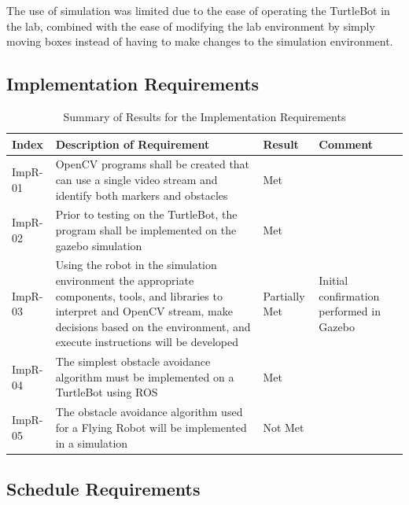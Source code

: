 \documentclass{article}[12]
\begin{document}
The use of simulation was limited due to the ease of operating the TurtleBot in the lab, combined with the ease of modifying the lab environment by simply moving boxes instead of having to make changes to the simulation environment.

 \subsection{Implementation Requirements}
 
	\begin{table}[H]
  \small
		\begin{tabular}{p{2cm} p{8cm} p{2cm} p{3cm}}
			\hline
			{\textbf{Index}} & {\textbf{Description of Requirement}} & {\textbf{Result}} & {\textbf{Comment}} \\ \hline 
ImpR-01 & OpenCV programs shall be created that can use a single video stream and identify both markers and obstacles & Met & \\ 
ImpR-02 & Prior to testing on the TurtleBot, the program shall be implemented on the gazebo simulation & Met & \\
ImpR-03 & Using the robot in the simulation environment the appropriate components, tools, and libraries to interpret and OpenCV stream, make decisions based on the environment, and execute instructions will be developed & Partially Met & Initial confirmation performed in Gazebo \\
ImpR-04 & The simplest obstacle avoidance algorithm must be implemented on a TurtleBot using ROS & Met & \\
ImpR-05 & The obstacle avoidance algorithm used for a Flying Robot will be implemented in a simulation & Not Met & \\ \hline
		\end{tabular}
		\caption{Summary of Results for the Implementation Requirements}
		\label{table:impresults}
 \end{table}

 
 \subsection{Schedule Requirements}
\end{document}
